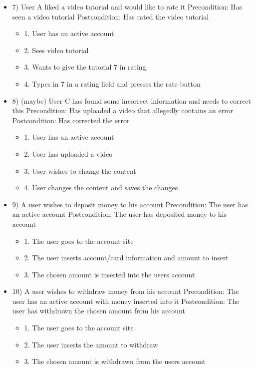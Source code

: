 \begin{itemize}
\item 7)
User A liked a video tutorial and would like to rate it
\newline Precondition: Has seen a video tutorial
\newline Postcondition: Has rated the video tutorial
\begin{itemize}
	\item 1. User has an active account
	\item 2. Sees video tutorial
	\item 3. Wants to give the tutorial 7 in rating
	\item 4. Types in 7 in a rating field and presses the rate button
\end{itemize}

\item 8) (maybe)
User C has found some incorrect information and needs to correct this
\newline Precondition: Has uploaded a video that allegedly contains an error
\newline Postcondition: Has corrected the error
\begin{itemize} 
	\item 1. User has an active account
	\item 2. User has uploaded a video
	\item 3. User wishes to change the content
	\item 4. User changes the content and saves the changes
\end{itemize}

\item 9)
A user wishes to deposit money to his account
\newline Precondition: The user has an active account
\newline Postcondition: The user has deposited money to his account
\begin{itemize}
	\item 1. The user goes to the account site
	\item 2. The user inserts account/card information and amount to insert
	\item 3. The chosen amount is inserted into the users account
\end{itemize}

\item 10)
A user wishes to withdraw money from his account
\newline Precondition: The user has an active account with money inserted into it
\newline Postcondition: The user has withdrawn the chosen amount from his account
\begin{itemize}
	\item 1. The user goes to the account site
	\item 2. The user inserts the amount to withdraw
	\item 3. The chosen amount is withdrawn from the users account
\end{itemize}


\end{itemize}
